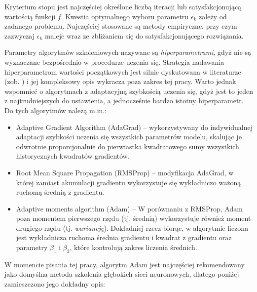 Kryterium stopu jest najczęściej określone liczbą iteracji lub satysfakcjonującą wartością funkcji $f$. Kwestia optymalnego wyboru parametru $\epsilon_k$ zależy od zadanego problemu. Najczęściej stosowane są metody empiryczne, przy czym zazwyczaj $\epsilon_k$ maleje wraz ze zbliżaniem się do satysfakcjonującego rozwiązania.

Parametry algorytmów szkoleniowych nazywane są \textit{hiperparametrami}, gdyż nie są wyznaczane bezpośrednio w procedurze uczenia się. Strategia nadawania hiperparametrom wartości początkowych jest silnie dyskutowana w literaturze (zob. \cite{Koch2017AutomatedHT}) i jej kompleksowy opis wykracza poza zakres tej pracy. Warto jednak wspomnieć o algorytmach z adaptacyjną szybkością uczenia się, gdyż jest to jeden z najtrudniejszych do ustawienia, a jednocześnie bardzo istotny hiperparametr. Do tych algorytmów należą m.in.:
\begin{itemize}[noitemsep,nolistsep]
 \item Adaptive Gradient Algorithm (AdaGrad) \cite{Duchi:2011:ASM:1953048.2021068} -- wykorzystywany do indywidualnej adaptacji szybkości uczenia się wszystkich parametrów modelu, skalując je odwrotnie proporcjonalnie do pierwiastka kwadratowego sumy wszystkich historycznych kwadratów gradientów.
 \item Root Mean Square Propagation (RMSProp) \cite{SCHMIDHUBER201585} -- modyfikacja AdaGrad, w której zamiast akumulacji gradientu wykorzystuje się wykładniczo ważoną ruchomą średnią z gradientu.
 \item Adaptive moments algorithm (Adam) \cite{DBLP:journals/corr/KingmaB14} -- W porównaniu z RMSProp, Adam poza momentem pierwszego rzędu (tj. średnią) wykorzystuje również moment drugiego rzędu (tj. \textit{wariancję}). Dokładniej rzecz biorąc, w algorytmie liczona jest wykładnicza ruchoma średnia gradientu i kwadrat z gradientu oraz parametry $\beta_1$ i $\beta_2$, które kontrolują zakres liczenia średnich.
\end{itemize}
W momencie pisania tej pracy, algorytm Adam jest najczęściej rekomendowany jako domyślna metoda szkolenia głębokich sieci neuronowych, dlatego poniżej zamieszczono jego dokładny opis:
